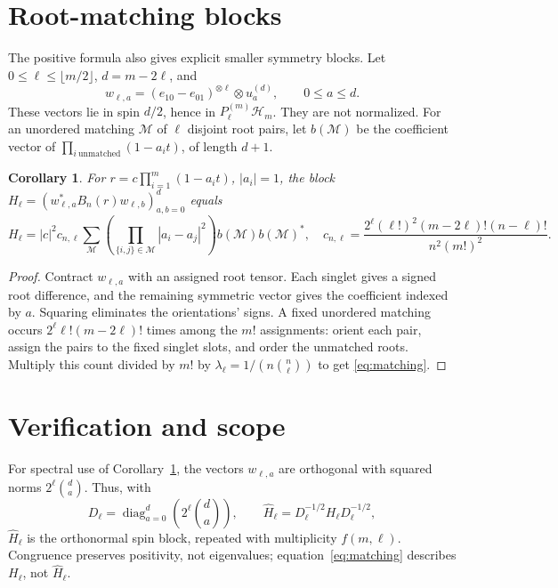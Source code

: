 \documentclass[11pt,a4paper]{article}
\newtheorem{corollary}[theorem]{Corollary}
\theoremstyle{remark}\newtheorem{remark}[theorem]{Remark}
\newcommand{\HH}{\mathcal H}
\newcommand{\bin}[2]{\binom{#1}{#2}}
\begin{document}
\section{Root-matching blocks}
The positive formula also gives explicit smaller symmetry blocks. Let $0\leq\ell\leq\lfloor m/2\rfloor$, $d=m-2\ell$, and
\[
 w_{\ell,a}=(e_{10}-e_{01})^{\otimes\ell}\otimes u_a^{(d)},
 \qquad 0\leq a\leq d.
\]
These vectors lie in spin $d/2$, hence in $P_\ell^{(m)}\HH_m$. They are not normalized. For an unordered matching $\mathcal M$ of $\ell$ disjoint root pairs, let $b(\mathcal M)$ be the coefficient vector of
$\prod_{i\ \mathrm{unmatched}}(1-a_it)$, of length $d+1$.

\begin{corollary}\label{cor:matching}
For $r=c\prod_{i=1}^m(1-a_it)$, $|a_i|=1$, the block
$H_\ell=(w_{\ell,a}^*B_n(r)w_{\ell,b})_{a,b=0}^d$ equals
\begin{equation}\label{eq:matching}
 H_\ell=|c|^2c_{n,\ell}\sum_{\mathcal M}
       \left(\prod_{\{i,j\}\in\mathcal M}|a_i-a_j|^2\right)
       b(\mathcal M)b(\mathcal M)^*,
 \quad
 c_{n,\ell}=\frac{2^\ell(\ell!)^2(m-2\ell)!(n-\ell)!}{n^2(m!)^2}.
\end{equation}
\end{corollary}
\begin{proof}
Contract $w_{\ell,a}$ with an assigned root tensor. Each singlet gives a signed root difference, and the remaining symmetric vector gives the coefficient indexed by $a$. Squaring eliminates the orientations' signs. A fixed unordered matching occurs $2^\ell\ell!(m-2\ell)!$ times among the $m!$ assignments: orient each pair, assign the pairs to the fixed singlet slots, and order the unmatched roots. Multiply this count divided by $m!$ by $\lambda_\ell=1/(n\bin n\ell)$ to get \eqref{eq:matching}.
\end{proof}

\section{Verification and scope}
For spectral use of Corollary~\ref{cor:matching}, the vectors $w_{\ell,a}$ are orthogonal with squared norms $2^\ell\bin da$. Thus, with
\[
 D_\ell=\operatorname{diag}_{a=0}^{d}\!\left(2^\ell\bin da\right),
 \qquad \widehat H_\ell=D_\ell^{-1/2}H_\ell D_\ell^{-1/2},
\]
$\widehat H_\ell$ is the orthonormal spin block, repeated with multiplicity $f(m,\ell)$. Congruence preserves positivity, not eigenvalues; equation~\eqref{eq:matching} describes $H_\ell$, not $\widehat H_\ell$.
\end{document}

